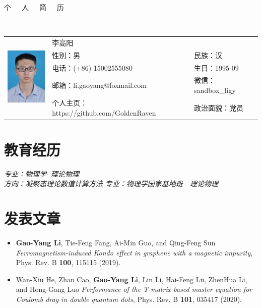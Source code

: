 \documentclass{resume}
\begin{document}

\begin{center}
\Huge{个~~~人~~~简~~~历}
\end{center}
\\
\Large{
  \begin{tabu}{ c l l }
    &
   \scshape{李高阳} &  \\
    & 性别：男 & 民族：汉 \\
    & 电话：(+86) 15002555080 & 生日：1995-09 \\
    & 邮箱：li.gaoyang@foxmail.com & 微信：sandbox\_ligy\\
    & 个人主页：https://github.com/GoldenRaven & 政治面貌：党员
  \end{tabu}
}

\section{教育经历}
\textit{专业：物理学$\cdot$ 理论物理}\\
\textit{方向：凝聚态理论数值计算方法}
\textit{专业：物理学国家基地班\ \ 理论物理}

\section{发表文章}
\begin{itemize}
\item \textbf{Gao-Yang Li}, Tie-Feng Fang, Ai-Min Guo, and Qing-Feng Sun \textit{Ferromagnetism-induced Kondo effect in graphene with a magnetic impurity}, Phys. Rev. B \textbf{100}, 115115 (2019).
\item Wan-Xiu He, Zhan Cao, \textbf{Gao-Yang Li}, Lin Li, Hai-Feng Lü, ZhenHua Li, and Hong-Gang Luo \textit{Performance of the T-matrix based master equation for Coulomb drag in double quantum dots}, Phys. Rev. B \textbf{101}, 035417 (2020).
\end{itemize}
\end{document}
